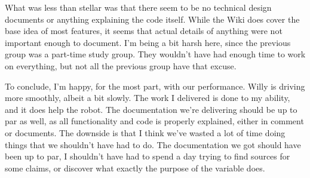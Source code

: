 What was less than stellar was that there seem to be no technical design documents or anything explaining the code itself.
While the Wiki does cover the base idea of most features, it seems that actual details of anything were not important enough to document.
I'm being a bit harsh here, since the previous group was a part-time study group.
They wouldn't have had enough time to work on everything, but not all the previous group have that excuse.

To conclude, I'm happy, for the most part, with our performance.
Willy is driving more smoothly, albeit a bit slowly.
The work I delivered is done to my ability, and it does help the robot.
The documentation we're delivering should be up to par as well, as all functionality and code is properly explained, either in comment or documents.
The downside is that I think we've wasted a lot of time doing things that we shouldn't have had to do.
The documentation we got should have been up to par, I shouldn't have had to spend a day trying to find sources for some claims, or discover what exactly the purpose of the variable  does.

\newpage
